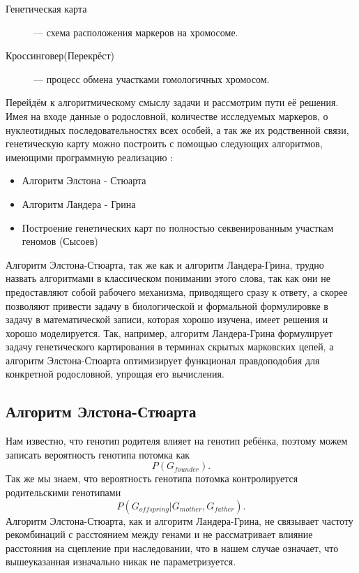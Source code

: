 \documentclass{matmex-diploma-custom}
\begin{document}
\begin{description}
\item[Генетическая карта] --- схема расположения маркеров на
  хромосоме.
\item[Кроссинговер(Перекрёст)] --- процесс обмена участками
  гомологичных хромосом.
\end{description}

Перейдём к алгоритмическому смыслу задачи и рассмотрим пути её
решения. Имея на входе данные о родословной, количестве исследуемых
маркеров, о нуклеотидных последовательностях всех особей, а так же их
родственной связи, генетическую карту можно построить с помощью
следующих алгоритмов, имеющими программную реализацию
\cite{fishelson2002exact}:
\begin{itemize}
\item Алгоритм Элстона - Стюарта
\item Алгоритм Ландера - Грина
\item Построение генетических карт по полностью секвенированным
  участкам геномов (Сысоев)
\end{itemize}

Алгоритм Элстона-Стюарта, так же как и алгоритм Ландера-Грина, трудно
назвать алгоритмами в классическом понимании этого слова, так как они
не предоставляют собой рабочего механизма, приводящего сразу к ответу,
а скорее позволяют привести задачу в биологической и формальной
формулировке в задачу в математической записи, которая хорошо изучена,
имеет решения и хорошо моделируется. Так, например, алгоритм
Ландера-Грина формулирует задачу генетического картирования в терминах
скрытых марковских цепей, а алгоритм Элстона-Стюарта оптимизирует
функционал правдоподобия для конкретной родословной, упрощая его
вычисления.

\subsection{Алгоритм Элстона-Стюарта}

Нам известно, что генотип родителя влияет на генотип ребёнка, поэтому
можем записать вероятность генотипа потомка как $$P(G_{founder}).$$
Так же мы знаем, что вероятность генотипа потомка контролируется
родительскими генотипами $$P(G_{offspring} | G_{mother},
G_{father}).$$ Алгоритм Элстона-Стюарта, как и алгоритм Ландера-Грина,
не связывает частоту рекомбинаций с расстоянием между генами и не
рассматривает влияние расстояния на сцепление при наследовании, что в
нашем случае означает, что вышеуказанная изначально никак не
параметризуется.
\end{document}
